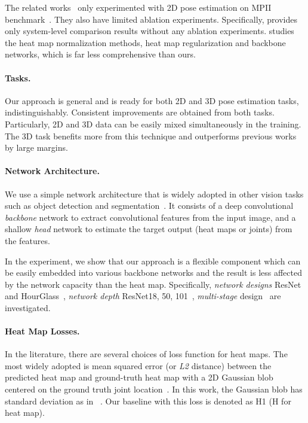 \documentclass[runningheads]{llncs}
\begin{document}
The related works~\cite{luvizon2017human,nibali2018numerical} only experimented with 2D pose estimation on MPII benchmark~\cite{mpiiwebpage}. They also have limited ablation experiments. Specifically, \cite{luvizon2017human} provides only system-level comparison results without any ablation experiments. \cite{nibali2018numerical} studies the heat map normalization methods, heat map regularization and backbone networks, which is far less comprehensive than ours.

\paragraph{\textbf{Tasks.}} 

Our approach is general and is ready for both 2D and 3D pose estimation tasks, indistinguishably. Consistent improvements are obtained from both tasks. Particularly, 2D and 3D data can be easily mixed simultaneously in the training. The 3D task benefits more from this technique and outperforms previous works by large margins.

\paragraph{\textbf{Network Architecture.}}

We use a simple network architecture that is widely adopted in other vision tasks such as object detection and  segmentation~\cite{he2016deep,he2017mask}. It consists of a deep convolutional \emph{backbone} network to extract convolutional features from the input image, and a shallow \emph{head} network to estimate the target output (heat maps or joints) from the features.

In the experiment, we show that our approach is a flexible component which can be easily embedded into various backbone networks and the result is less affected by the network capacity than the heat map. Specifically, \emph{network designs} ResNet~\cite{he2016deep} and HourGlass~\cite{newell2016stacked}, \emph{network depth} ResNet18, 50, 101~\cite{he2016deep}, \emph{multi-stage} design~\cite{wei2016convolutional,carreira2016human} are investigated.


\paragraph{\textbf{Heat Map Losses.}}

In the literature, there are several choices of loss function for heat maps. The most widely adopted is mean squared error (or \emph{L2} distance) between the predicted heat map and ground-truth heat map with a 2D Gaussian blob centered on the ground truth joint location~\cite{tompson2014joint,wei2016convolutional,cao2016realtime,newell2016stacked,chen2017adversarial,chou2017self,chu2017multi,bulat2016human}. In this work, the Gaussian blob has standard deviation  as in ~\cite{newell2016stacked}. Our baseline with this loss is denoted as H1 (H for heat map).
\end{document}
